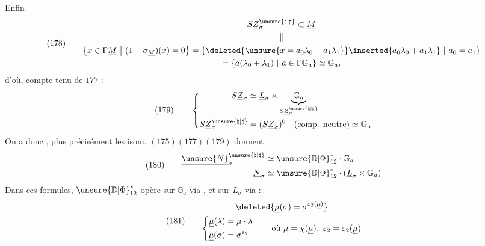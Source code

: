 Enfin
\[
(178)\qquad
\begin{gathered}
S\underline Z_\sigma^{\unsure{\natural|\sharp}}\subset\underline M\\
\parallel\\
\left\{x\in\Gamma\underline M\ \middle|\ (1-\sigma_{\underline M})(x)=0\right\}
=\left\{
\deleted{\unsure{x=a_0\lambda_0+a_1\lambda_1}}
\inserted{a_0\lambda_0+a_1\lambda_1}
\ \middle|\ a_0=a_1
\right\}\\
=\left\{a(\lambda_0+\lambda_1)\ \middle|\ a\in\Gamma\mathbb G_a\right\}
\simeq\mathbb G_a,
\end{gathered}
\]
d'où, compte tenu de \(177\) :
\[
(179)\qquad
\left\{
\begin{aligned}
S\underline Z_\sigma
&\simeq\underline L_\sigma\times
\underbrace{\mathbb G_a}_{S\underline Z_\sigma^{\unsure{\natural|\sharp}}}\\
S\underline Z_\sigma^{\unsure{\natural|\sharp}}
&=(S\underline Z_\sigma)^0
\quad\text{(comp. neutre)}\simeq\mathbb G_a
\end{aligned}
\right.
\]
On a donc
,
plus précisément les isom. \((175)(177)(179)\) donnent
\[
(180)\qquad
\begin{aligned}
\underline{\unsure{N}}_\sigma^{\unsure{\natural|\sharp}}
&\simeq\unsure{\mathbb D|\Phi}_{12}^{*}\cdot\mathbb G_a\\
\underline N_\sigma
&\simeq\unsure{\mathbb D|\Phi}_{12}^{*}\cdot
(\underline L_\sigma\times\mathbb G_a)
\end{aligned}
\]
Dans ces formules, \(\unsure{\mathbb D|\Phi}_{12}^{*}\) opère sur \(\mathbb G_a\)
via
,
et sur \(L_\sigma\) via
 :
\[
(181)\qquad
\begin{gathered}
\deleted{\underline\mu(\sigma)=\sigma^{\varepsilon_2(\underline\mu)}}\\
\left\{
\begin{aligned}
\underline\mu(\lambda)&=\mu\cdot\lambda\\
\underline\mu(\sigma)&=\sigma^{\varepsilon_2}
\end{aligned}
\right.
\qquad\text{où }\mu=\chi(\underline\mu),\ \varepsilon_2=\varepsilon_2(\underline\mu)
\end{gathered}
\]

